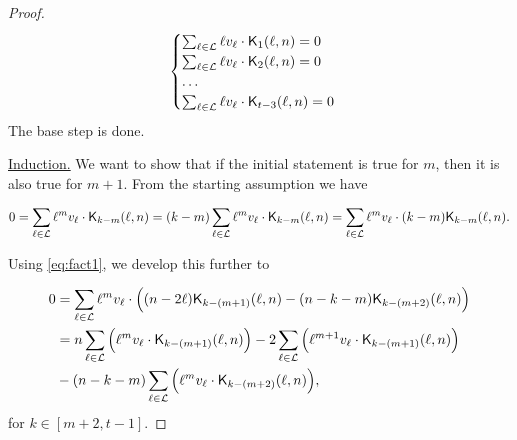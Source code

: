 \begin{proof}
    \begin{equation*}
        \begin{cases}
            \sum_{\ell \in \mathcal{L}} \ell v_\ell \cdot \mathsf{K}_{1}(\ell,n) = 0\\
            \sum_{\ell \in \mathcal{L}} \ell v_\ell \cdot \mathsf{K}_{2}(\ell,n) = 0\\
            \ldots\\
            \sum_{\ell \in \mathcal{L}} \ell v_\ell \cdot \mathsf{K}_{t-3}(\ell,n) = 0\\
        \end{cases}
    \end{equation*}
    The base step is done.

    \underline{Induction.} We want to show that if the initial statement is true for $m$, then it is also true for $m+1$. From the starting assumption we have

    $$
    0 = \sum_{\ell \in \mathcal{L}} \ell^mv_\ell \cdot \mathsf{K}_{k-m}(\ell,n) = (k-m)\sum_{\ell \in \mathcal{L}} \ell^mv_\ell \cdot \mathsf{K}_{k-m}(\ell,n) = \sum_{\ell \in \mathcal{L}} \ell^mv_\ell \cdot (k-m)\mathsf{K}_{k-m}(\ell,n).
    $$

    Using \cref{eq:fact1}, we develop this further to

    \begin{equation*}
    \begin{split}
        0 &= \sum_{\ell \in \mathcal{L}} \ell^mv_\ell \cdot \Big( (n - 2\ell)\mathsf{K}_{k-(m+1)}(\ell,n) - (n - k - m)\mathsf{K}_{k-(m+2)}(\ell,n) \Big)\\
        & = n \sum_{\ell \in \mathcal{L}} \Big( \ell^mv_\ell \cdot \mathsf{K}_{k-(m+1)}(\ell,n) \Big) - 2\sum_{\ell \in \mathcal{L}} \Big( \ell^{m+1}v_\ell \cdot \mathsf{K}_{k-(m+1)}(\ell,n) \Big)\\& - (n - k - m)\sum_{\ell \in \mathcal{L}} \Big( \ell^mv_\ell \cdot \mathsf{K}_{k-(m+2)}(\ell,n) \Big),
    \end{split}
    \end{equation*}
    for $k \in [m+2, t-1]$.


\end{proof}
